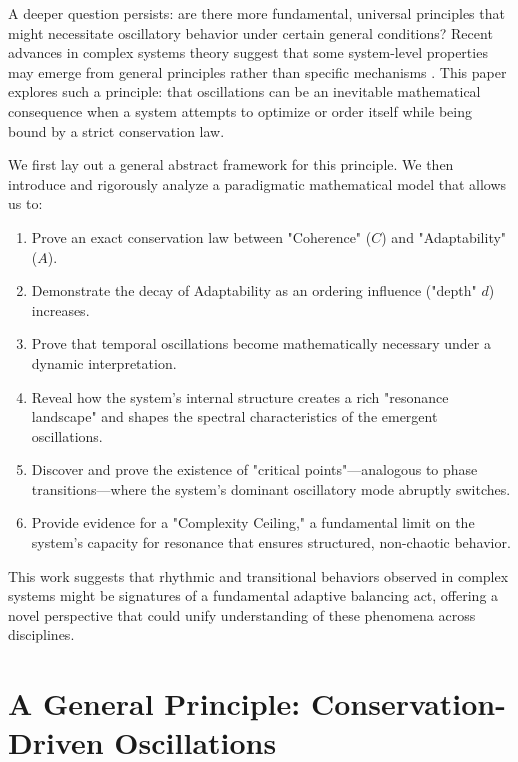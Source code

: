 \documentclass[11pt,a4paper]{article}
\begin{document}
A deeper question persists: are there more fundamental, universal principles that might necessitate oscillatory behavior under certain general conditions? Recent advances in complex systems theory suggest that some system-level properties may emerge from general principles rather than specific mechanisms \cite{Bak1987,Jensen1998,Kello2010,Thurner2018,Morowitz2002}. This paper explores such a principle: that oscillations can be an inevitable mathematical consequence when a system attempts to optimize or order itself while being bound by a strict conservation law.

We first lay out a general abstract framework for this principle. We then introduce and rigorously analyze a paradigmatic mathematical model that allows us to:
\begin{enumerate}
    \item Prove an exact conservation law between "Coherence" ($C$) and "Adaptability" ($A$).
    \item Demonstrate the decay of Adaptability as an ordering influence ("depth" $d$) increases.
    \item Prove that temporal oscillations become mathematically necessary under a dynamic interpretation.
    \item Reveal how the system's internal structure creates a rich "resonance landscape" and shapes the spectral characteristics of the emergent oscillations.
    \item Discover and prove the existence of "critical points"---analogous to phase transitions---where the system's dominant oscillatory mode abruptly switches.
    \item Provide evidence for a "Complexity Ceiling," a fundamental limit on the system's capacity for resonance that ensures structured, non-chaotic behavior.
\end{enumerate}

This work suggests that rhythmic and transitional behaviors observed in complex systems might be signatures of a fundamental adaptive balancing act, offering a novel perspective that could unify understanding of these phenomena across disciplines.


\section{A General Principle: Conservation-Driven Oscillations}
\end{document}
